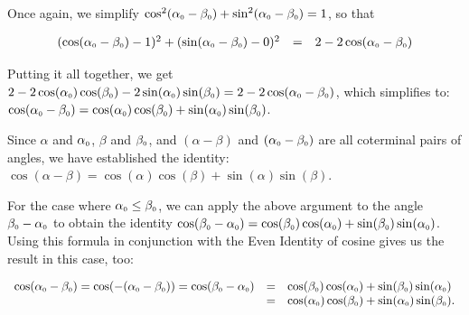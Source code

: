 \documentclass{ximera}
\begin{document}
Once again, we simplify $\cos^2(\alpha_{\mbox{\tiny $0$}} - \beta_{\mbox{\tiny $0$}}) + \sin^2(\alpha_{\mbox{\tiny $0$}} - \beta_{\mbox{\tiny $0$}})= 1$, so that

\[ \begin{array}{rcl}
(\cos(\alpha_{\mbox{\tiny $0$}} - \beta_{\mbox{\tiny $0$}}) - 1)^2 + (\sin(\alpha_{\mbox{\tiny $0$}} - \beta_{\mbox{\tiny $0$}}) - 0)^2 & = & 2  - 2\cos(\alpha_{\mbox{\tiny $0$}} - \beta_{\mbox{\tiny $0$}}) \\ \end{array} \]

Putting it all together, we get $2  - 2\cos(\alpha_{\mbox{\tiny $0$}})\cos(\beta_{\mbox{\tiny $0$}}) - 2\sin(\alpha_{\mbox{\tiny $0$}})\sin(\beta_{\mbox{\tiny $0$}}) = 2  - 2\cos(\alpha_{\mbox{\tiny $0$}} - \beta_{\mbox{\tiny $0$}})$, which simplifies to: $\cos(\alpha_{\mbox{\tiny $0$}} - \beta_{\mbox{\tiny $0$}}) = \cos(\alpha_{\mbox{\tiny $0$}})\cos(\beta_{\mbox{\tiny $0$}}) + \sin(\alpha_{\mbox{\tiny $0$}})\sin(\beta_{\mbox{\tiny $0$}})$. 

\smallskip

Since $\alpha$ and $\alpha_{\mbox{\tiny $0$}}$, $\beta$ and $\beta_{\mbox{\tiny $0$}}$, and $(\alpha - \beta)$ and $(\alpha_{\mbox{\tiny $0$}}- \beta_{\mbox{\tiny $0$}})$ are all coterminal pairs of angles, we have established the identity: $\cos(\alpha - \beta) = \cos(\alpha) \cos(\beta) + \sin(\alpha) \sin(\beta)$. 

\smallskip

For the case where $\alpha_{\mbox{\tiny $0$}} \leq \beta_{\mbox{\tiny $0$}}$, we can apply the above argument to the angle $\beta_{\mbox{\tiny $0$}} - \alpha_{\mbox{\tiny $0$}}$ to obtain the identity  $\cos(\beta_{\mbox{\tiny $0$}} - \alpha_{\mbox{\tiny $0$}}) = \cos(\beta_{\mbox{\tiny $0$}})\cos(\alpha_{\mbox{\tiny $0$}}) + \sin(\beta_{\mbox{\tiny $0$}})\sin(\alpha_{\mbox{\tiny $0$}})$.  Using this formula in conjunction with  the  Even Identity of cosine gives us the result in this case, too: 

\[ \begin{array}{rcl}  \cos(\alpha_{\mbox{\tiny $0$}} - \beta_{\mbox{\tiny $0$}}) =  \cos( - (\alpha_{\mbox{\tiny $0$}} - \beta_{\mbox{\tiny $0$}}))  =  \cos(\beta_{\mbox{\tiny $0$}} - \alpha_{\mbox{\tiny $0$}})  & = & \cos(\beta_{\mbox{\tiny $0$}})\cos(\alpha_{\mbox{\tiny $0$}}) + \sin(\beta_{\mbox{\tiny $0$}})\sin(\alpha_{\mbox{\tiny $0$}}) \\
& = & \cos(\alpha_{\mbox{\tiny $0$}})\cos(\beta_{\mbox{\tiny $0$}}) + \sin(\alpha_{\mbox{\tiny $0$}})\sin(\beta_{\mbox{\tiny $0$}}). \end{array} \]
\end{document}

